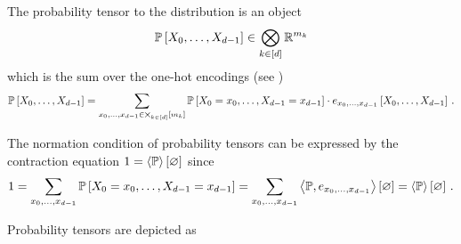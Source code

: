 The probability tensor to the distribution is an object
		\[ \mathbb{P}\left[X_{0},\ldots,X_{d-1}\right] \in \bigotimes_{k\in[d]}\mathbb{R}^{m_{k}} \]
which is the sum over the one-hot encodings (see )
		\[ \mathbb{P}\left[X_{0},\ldots,X_{d-1}\right] = \sum_{x_{0},\ldots,x_{d-1}\in\bigtimes_{k\in[d]}[m_{k}]} \mathbb{P}\left[X_{0}=x_{0},\ldots,X_{d-1}=x_{d-1}\right] \cdot e_{x_{0},\ldots,x_{d-1}}\left[X_{0},\ldots,X_{d-1}\right] \, . \]
		
The normation condition of probability tensors can be expressed by the contraction equation $1= \left\langle \mathbb{P}\right\rangle \left[ \varnothing \right]$ since
\begin{align*}
	1 = \sum_{x_{0},\ldots,x_{d-1}}\mathbb{P}\left[X_{0}=x_{0},\ldots,X_{d-1}=x_{d-1}\right]
	=  \sum_{x_{0},\ldots,x_{d-1}}\left\langle \mathbb{P}, e_{x_{0},\ldots,x_{d-1}}\right\rangle \left[ \varnothing \right]
	= \left\langle \mathbb{P}\right\rangle \left[ \varnothing \right] \, . 
\end{align*}



Probability tensors are depicted as
\begin{center}
	
\end{center}




